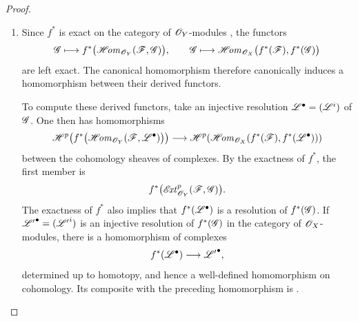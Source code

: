 \begin{proof}
\begin{enumerate}
  \item[\rm(i)]
  Since $f^*$ is exact on the category of $\mathscr{O}_Y$-modules
  , the functors
  \[
    \mathscr{G}\longmapsto
      f^*\bigl(\mathscr{H}\!\mathit{om}_{\mathscr{O}_Y}(\mathscr{F},\mathscr{G})\bigr),
    \qquad
    \mathscr{G}\longmapsto
      \mathscr{H}\!\mathit{om}_{\mathscr{O}_X}\bigl(f^*(\mathscr{F}),f^*(\mathscr{G})\bigr)
  \]
  are left exact.  The canonical homomorphism
   therefore canonically induces a
  homomorphism between their derived functors.

  To compute these derived functors, take an injective resolution
  $\mathscr{L}^\bullet=(\mathscr{L}^i)$ of $\mathscr{G}$.  One then has
  homomorphisms
  \[
    \begin{aligned}
    \mathscr{H}^p\!\left(
      f^*\bigl(\mathscr{H}\!\mathit{om}_{\mathscr{O}_Y}
        (\mathscr{F},\mathscr{L}^\bullet)\bigr)\right)
    \longrightarrow
    \mathscr{H}^p\!\left(
      \mathscr{H}\!\mathit{om}_{\mathscr{O}_X}
        (f^*(\mathscr{F}),f^*(\mathscr{L}^\bullet))\right)
    \end{aligned}
  \]
  between the cohomology sheaves of complexes.
  By the exactness of $f^*$, the first member is
  \[
    f^*\bigl(\mathscr{E}\!\mathit{xt}^p_{\mathscr{O}_Y}(\mathscr{F},\mathscr{G})\bigr).
  \]
  The exactness of $f^*$ also implies that
  $f^*(\mathscr{L}^\bullet)$ is a resolution of $f^*(\mathscr{G})$.
  If ${\mathscr{L}'}^\bullet=({\mathscr{L}'}^i)$ is an injective resolution
  of $f^*(\mathscr{G})$ in the category of $\mathscr{O}_X$-modules, there is a
  homomorphism of complexes
  \[
    f^*(\mathscr{L}^\bullet)\longrightarrow{\mathscr{L}'}^\bullet,
  \]
  determined up to homotopy, and hence a well-defined homomorphism on
  cohomology.  Its composite with the preceding homomorphism is
  .


\end{enumerate}
\end{proof}
